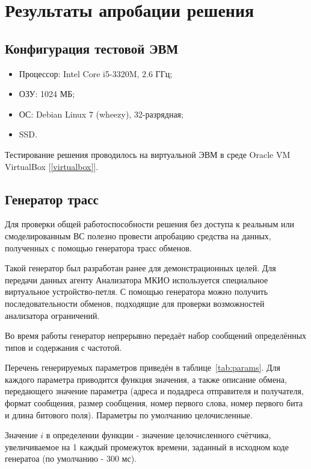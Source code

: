 \section{Результаты апробации решения}


\subsection{Конфигурация тестовой ЭВМ}
\label{subsec:test_stand}

\begin{itemize}
 \item Процессор: Intel Core i5-3320M, 2.6 ГГц;
 \item ОЗУ: 1024 МБ;
 \item ОС: Debian Linux 7 (wheezy), 32-разрядная;
 \item SSD. 
\end{itemize}

Тестирование решения проводилось на виртуальной ЭВМ в среде Oracle VM 
VirtualBox [\ref{virtualbox}].


\subsection{Генератор трасс}

Для проверки общей работоспособности решения без доступа к реальным 
или смоделированным ВС полезно провести апробацию средства на данных, 
полученных с помощью генератора трасс обменов.

Такой генератор был разработан ранее для демонстрационных целей. Для 
передачи данных агенту Анализатора МКИО используется специальное виртуальное 
устройство-петля. С помощью генератора можно получить последовательности 
обменов, подходящие для проверки возможностей анализатора ограничений.

Во время работы генератор непрерывно передаёт набор сообщений определённых 
типов и содержания с  частотой. 

Перечень генерируемых параметров приведён в таблице~\ref{tab:params}. Для 
каждого параметра приводится функция значения, а также описание 
обмена, передающего значение параметра (адреса и подадреса отправителя и 
получателя, формат сообщения, размер сообщения, номер первого слова, номер 
первого бита и длина битового поля). Параметры по умолчанию целочисленные.

Значение $i$ в определении функции - значение целочисленного счётчика, 
увеличиваемое на 1 каждый промежуток времени, заданный в исходном коде 
генератоа (по умолчанию - 300 мс).

